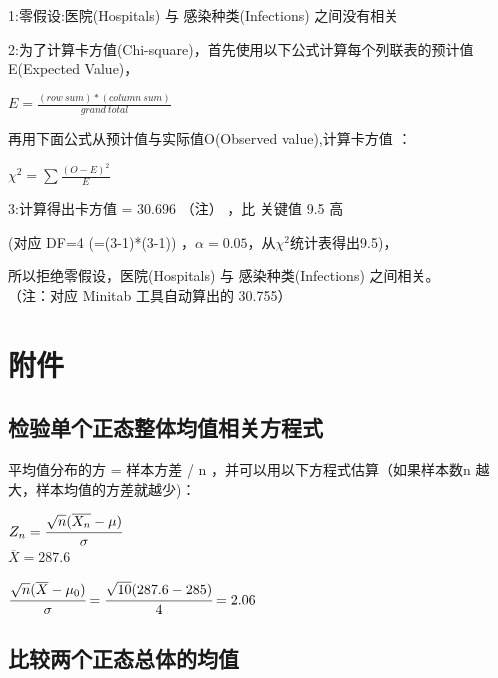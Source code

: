 1:零假设:医院(Hospitals) 与 感染种类(Infections) 之间没有相关

2:为了计算卡方值(Chi-square)，首先使用以下公式计算每个列联表的预计值E(Expected
Value)，

\(E = \frac{(row \ sum) * (column \ sum)} {grand \ total}\)

再用下面公式从预计值与实际值O(Observed value),计算卡方值 ：

\(\chi ^2 = \sum \frac{(O - E)^2} {E}\)

3:计算得出卡方值 = 30.696 （注） ，比 关键值 9.5 高

\begin{description}
\tightlist
\item[]
(对应 DF=4 (=(3-1)*(3-1))
，\(\alpha = 0.05\)，从\(\chi ^2\)统计表得出9.5)，\\
\end{description}

所以拒绝零假设，医院(Hospitals) 与 感染种类(Infections) 之间相关。\\

（注：对应 Minitab 工具自动算出的 30.755）\\

\hypertarget{ux9644ux4ef6}{%
\section{附件}\label{ux9644ux4ef6}}

\hypertarget{ux68c0ux9a8cux5355ux4e2aux6b63ux6001ux6574ux4f53ux5747ux503cux76f8ux5173ux65b9ux7a0bux5f0f}{%
\subsection{检验单个正态整体均值相关方程式}\label{ux68c0ux9a8cux5355ux4e2aux6b63ux6001ux6574ux4f53ux5747ux503cux76f8ux5173ux65b9ux7a0bux5f0f}}

平均值分布的方 = 样本方差 / n ，并可以用以下方程式估算（如果样本数n
越大，样本均值的方差就越少)：

\(Z_n = \cfrac{ \sqrt{n}(\overline{X_n} - \mu) }{\sigma}\)\\

\(\overline{X} = 287.6\)

\(\cfrac{ \sqrt{n}(\overline{X} - \mu_0) }{\sigma} = \cfrac{ \sqrt{10}( 287.6 - 285 ) }{4} = 2.06\)\\

\hypertarget{ux6bd4ux8f83ux4e24ux4e2aux6b63ux6001ux603bux4f53ux7684ux5747ux503c-1}{%
\subsection{比较两个正态总体的均值}\label{ux6bd4ux8f83ux4e24ux4e2aux6b63ux6001ux603bux4f53ux7684ux5747ux503c-1}}


